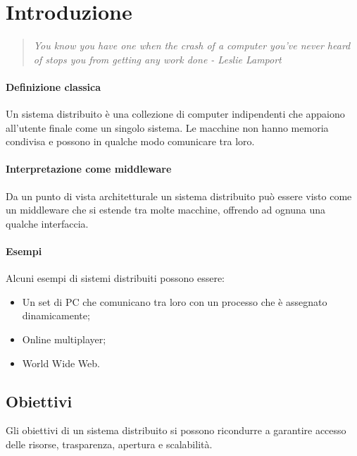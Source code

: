 \section{Introduzione}

\begin{quote}
    \emph{You know you have one when the crash of a computer you've
    never heard of stops you from getting any work done - Leslie Lamport} 
\end{quote}

\paragraph{Definizione classica}
Un sistema distribuito è una collezione di computer indipendenti
che appaiono all'utente finale come un singolo sistema.
Le macchine non hanno memoria condivisa e possono in qualche modo 
comunicare tra loro.


\paragraph{Interpretazione come middleware}
Da un punto di vista architetturale un sistema distribuito può essere
 visto come un middleware che si estende tra molte macchine, offrendo 
ad ognuna una qualche interfaccia.

\paragraph{Esempi}
Alcuni esempi di sistemi distribuiti possono essere:
\begin{itemize}
    \item Un set di PC che comunicano tra loro con un 
    processo che è assegnato dinamicamente; 
    \item Online multiplayer; 
    \item World Wide Web.
\end{itemize}

\subsection{Obiettivi}
Gli obiettivi di un sistema distribuito si possono ricondurre a garantire
accesso delle risorse, trasparenza, apertura e scalabilità.

